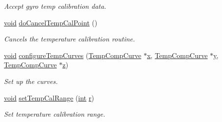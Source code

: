 \begin{DoxyCompactItemize}
\begin{DoxyCompactList}\small\item\em Accept gyro temp calibration data. \end{DoxyCompactList}\item 
\hyperlink{group___u_a_v_objects_plugin_ga444cf2ff3f0ecbe028adce838d373f5c}{void} \hyperlink{class_calibration_aee6c4261672e5a8c194c331a71963622}{do\-Cancel\-Temp\-Cal\-Point} ()
\begin{DoxyCompactList}\small\item\em Cancels the temperature calibration routine. \end{DoxyCompactList}\item 
\hyperlink{group___u_a_v_objects_plugin_ga444cf2ff3f0ecbe028adce838d373f5c}{void} \hyperlink{class_calibration_a7f1864654eed2d90d8bb5949c9249454}{configure\-Temp\-Curves} (\hyperlink{class_temp_comp_curve}{Temp\-Comp\-Curve} $\ast$\hyperlink{glext_8h_a1db9d104e3c2128177f26aff7b46982f}{x}, \hyperlink{class_temp_comp_curve}{Temp\-Comp\-Curve} $\ast$\hyperlink{glext_8h_a42315f3ed8fff752bb47fd782309fcfc}{y}, \hyperlink{class_temp_comp_curve}{Temp\-Comp\-Curve} $\ast$\hyperlink{glext_8h_a642c8d69fd1a54f255c898df4f0dd7ca}{z})
\begin{DoxyCompactList}\small\item\em Set up the curves. \end{DoxyCompactList}\item 
\hyperlink{group___u_a_v_objects_plugin_ga444cf2ff3f0ecbe028adce838d373f5c}{void} \hyperlink{class_calibration_a895658576c504c370a7a7929a832f1b1}{set\-Temp\-Cal\-Range} (\hyperlink{ioapi_8h_a787fa3cf048117ba7123753c1e74fcd6}{int} \hyperlink{glext_8h_abe08814c2f72843fde4d8df41440d5a0}{r})
\begin{DoxyCompactList}\small\item\em Set temperature calibration range. \end{DoxyCompactList}\end{DoxyCompactItemize}
